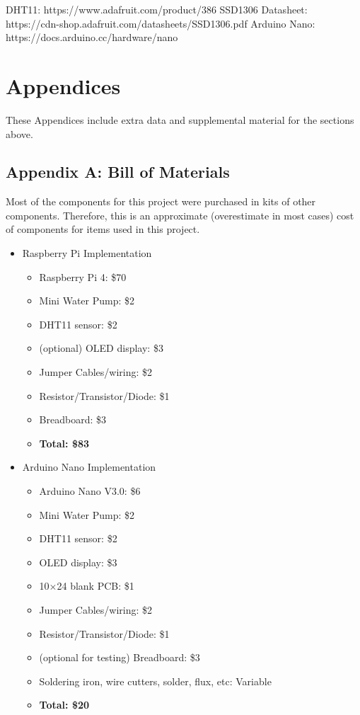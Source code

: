 \documentclass{article}
\begin{document}
	\begin{thebibliography}{X}
		 DHT11: https://www.adafruit.com/product/386
		 SSD1306 Datasheet: https://cdn-shop.adafruit.com/datasheets/SSD1306.pdf
		 Arduino Nano: https://docs.arduino.cc/hardware/nano
	\end{thebibliography}	
	
	\section{Appendices}
	These Appendices include extra data and supplemental material for the sections above.
	
	\subsection{Appendix A: Bill of Materials}
	Most of the components for this project were purchased in kits of other components. Therefore, this is an approximate (overestimate in most cases) cost of components for items used in this project. 
	
	\begin{multicols}{2}
		\begin{itemize}
			\item Raspberry Pi Implementation
			\begin{itemize}
				\item Raspberry Pi 4: \$70
				\item Mini Water Pump: \$2
				\item DHT11 sensor: \$2
				\item (optional) OLED display: \$3
				\item Jumper Cables/wiring: \$2
				\item Resistor/Transistor/Diode: \$1
				\item Breadboard: \$3
				\item \textbf{Total: \$83}
			\end{itemize}
			
			\columnbreak
			
			\item Arduino Nano Implementation
			\begin{itemize}
				\item Arduino Nano V3.0: \$6
				\item Mini Water Pump: \$2
				\item DHT11 sensor: \$2
				\item OLED display: \$3
				\item 10$\times$24 blank PCB: \$1
				\item Jumper Cables/wiring: \$2
				\item Resistor/Transistor/Diode: \$1
				\item (optional for testing) Breadboard: \$3
				\item Soldering iron, wire cutters, solder, flux, etc: Variable
				\item \textbf{Total: \$20}
			\end{itemize}
		\end{itemize}
	\end{multicols}
	
\end{document}

